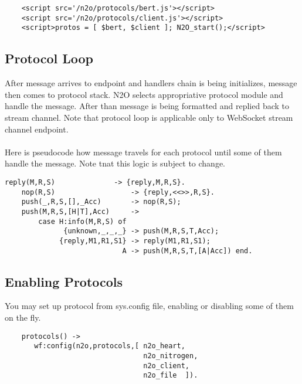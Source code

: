 \vspace{1\baselineskip}
\begin{lstlisting}
    <script src='/n2o/protocols/bert.js'></script>
    <script src='/n2o/protocols/client.js'></script>
    <script>protos = [ $bert, $client ]; N2O_start();</script>
\end{lstlisting}


\newpage
\subsection*{Protocol Loop}
After message arrives to endpoint and handlers chain is being initializes,
message then comes to protocol stack. N2O selects appropriative protocol
module and handle the message. After than message is being formatted and
replied back to stream channel. Note that protocol loop is applicable
only to WebSocket stream channel endpoint.


\paragraph{}
Here is pseudocode how message travels for each protocol until some
of them handle the message. Note tnat this logic is subject to change.

\vspace{1\baselineskip}
\begin{lstlisting}[caption=Top-level protocol loop in {n2o}\_{proto}]
    reply(M,R,S)              -> {reply,M,R,S}.
    nop(R,S)                  -> {reply,<<>>,R,S}.
    push(_,R,S,[],_Acc)       -> nop(R,S);
    push(M,R,S,[H|T],Acc)     ->
        case H:info(M,R,S) of
              {unknown,_,_,_} -> push(M,R,S,T,Acc);
             {reply,M1,R1,S1} -> reply(M1,R1,S1);
                            A -> push(M,R,S,T,[A|Acc]) end.
\end{lstlisting}
\vspace{1\baselineskip}

\newpage
\subsection*{Enabling Protocols}
You may set up protocol from sys.config file,
enabling or disabling some of them on the fly.

\vspace{1\baselineskip}
\begin{lstlisting}
    protocols() ->
       wf:config(n2o,protocols,[ n2o_heart,
                                 n2o_nitrogen,
                                 n2o_client,
                                 n2o_file  ]).

\end{lstlisting}
\vspace{1\baselineskip}

